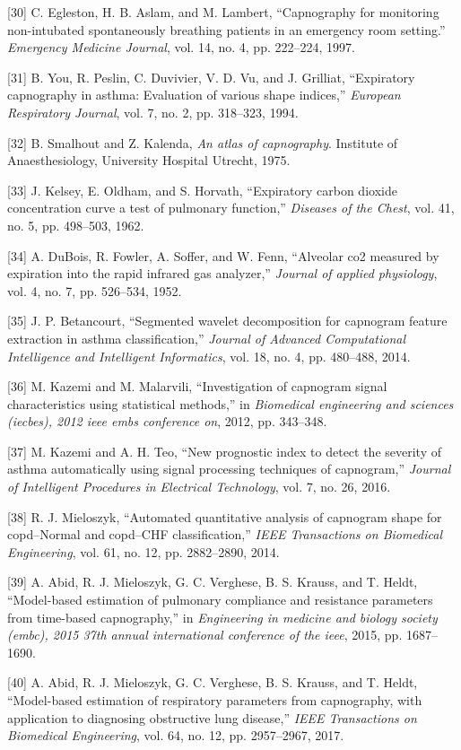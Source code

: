 \documentclass[12pt,]{article}
\begin{document}
\hypertarget{ref-egleston1997capnography}{}
{[}30{]} C. Egleston, H. B. Aslam, and M. Lambert, ``Capnography for
monitoring non-intubated spontaneously breathing patients in an
emergency room setting.'' \emph{Emergency Medicine Journal}, vol. 14,
no. 4, pp. 222--224, 1997.

\hypertarget{ref-you1994expiratory}{}
{[}31{]} B. You, R. Peslin, C. Duvivier, V. D. Vu, and J. Grilliat,
``Expiratory capnography in asthma: Evaluation of various shape
indices,'' \emph{European Respiratory Journal}, vol. 7, no. 2, pp.
318--323, 1994.

\hypertarget{ref-smalhout1975atlas}{}
{[}32{]} B. Smalhout and Z. Kalenda, \emph{An atlas of capnography}.
Institute of Anaesthesiology, University Hospital Utrecht, 1975.

\hypertarget{ref-kelsey1962expiratory}{}
{[}33{]} J. Kelsey, E. Oldham, and S. Horvath, ``Expiratory carbon
dioxide concentration curve a test of pulmonary function,''
\emph{Diseases of the Chest}, vol. 41, no. 5, pp. 498--503, 1962.

\hypertarget{ref-dubois1952alveolar}{}
{[}34{]} A. DuBois, R. Fowler, A. Soffer, and W. Fenn, ``Alveolar co2
measured by expiration into the rapid infrared gas analyzer,''
\emph{Journal of applied physiology}, vol. 4, no. 7, pp. 526--534, 1952.

\hypertarget{ref-betancourt2014segmented}{}
{[}35{]} J. P. Betancourt, ``Segmented wavelet decomposition for
capnogram feature extraction in asthma classification,'' \emph{Journal
of Advanced Computational Intelligence and Intelligent Informatics},
vol. 18, no. 4, pp. 480--488, 2014.

\hypertarget{ref-kazemi2012investigation}{}
{[}36{]} M. Kazemi and M. Malarvili, ``Investigation of capnogram signal
characteristics using statistical methods,'' in \emph{Biomedical
engineering and sciences (iecbes), 2012 ieee embs conference on}, 2012,
pp. 343--348.

\hypertarget{ref-kazemi2016new}{}
{[}37{]} M. Kazemi and A. H. Teo, ``New prognostic index to detect the
severity of asthma automatically using signal processing techniques of
capnogram,'' \emph{Journal of Intelligent Procedures in Electrical
Technology}, vol. 7, no. 26, 2016.

\hypertarget{ref-mieloszyk2014automated}{}
{[}38{]} R. J. Mieloszyk, ``Automated quantitative analysis of capnogram
shape for copd--Normal and copd--CHF classification,'' \emph{IEEE
Transactions on Biomedical Engineering}, vol. 61, no. 12, pp.
2882--2890, 2014.

\hypertarget{ref-abid2015model}{}
{[}39{]} A. Abid, R. J. Mieloszyk, G. C. Verghese, B. S. Krauss, and T.
Heldt, ``Model-based estimation of pulmonary compliance and resistance
parameters from time-based capnography,'' in \emph{Engineering in
medicine and biology society (embc), 2015 37th annual international
conference of the ieee}, 2015, pp. 1687--1690.

\hypertarget{ref-abid2017model}{}
{[}40{]} A. Abid, R. J. Mieloszyk, G. C. Verghese, B. S. Krauss, and T.
Heldt, ``Model-based estimation of respiratory parameters from
capnography, with application to diagnosing obstructive lung disease,''
\emph{IEEE Transactions on Biomedical Engineering}, vol. 64, no. 12, pp.
2957--2967, 2017.
\end{document}
